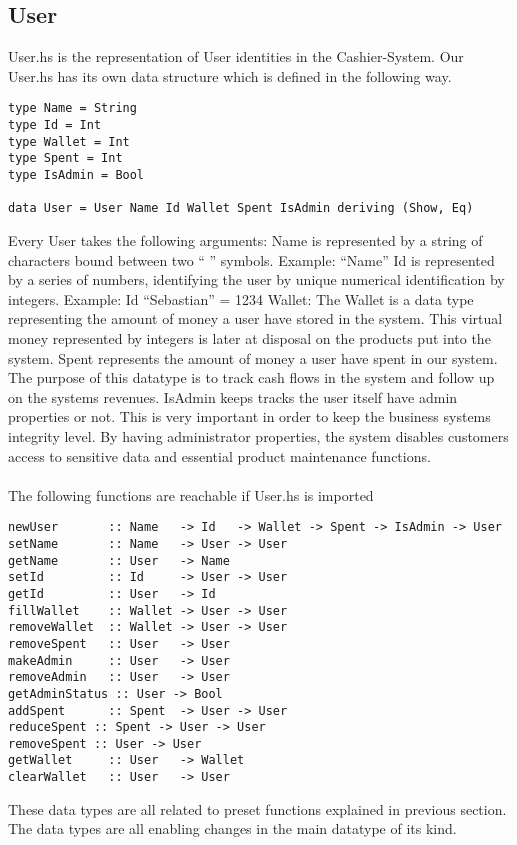 \documentclass[11pt]{article}
\begin{document}
\pagebreak
\subsection{User}
User.hs is the representation of User identities in the Cashier-System. Our User.hs has its own data structure which is defined in the following way.
\begin{lstlisting}
type Name = String
type Id = Int
type Wallet = Int
type Spent = Int
type IsAdmin = Bool

data User = User Name Id Wallet Spent IsAdmin deriving (Show, Eq)
\end{lstlisting}
Every User takes the following arguments:
Name is represented by a string of characters bound between two “ ” symbols.
Example: “Name”
Id is represented by a series of numbers, identifying the user by unique numerical identification by integers.
Example: Id “Sebastian” = 1234
Wallet: The Wallet is a data type representing the amount of money a user have stored in the system. This virtual money represented by integers is later at disposal on the products put into the system.
Spent represents the amount of money a user have spent in our system. The purpose of this datatype is to track cash flows in the system and follow up on the systems revenues.
IsAdmin keeps tracks the user itself have admin properties or not. This is very important in order to keep the business systems integrity level. By having administrator properties, the system disables customers access to sensitive data and essential product maintenance functions.
\\\\
The following functions are reachable if User.hs is imported\\
\begin{lstlisting}
newUser       :: Name   -> Id   -> Wallet -> Spent -> IsAdmin -> User
setName       :: Name   -> User -> User
getName       :: User   -> Name
setId         :: Id     -> User -> User
getId         :: User   -> Id
fillWallet    :: Wallet -> User -> User
removeWallet  :: Wallet -> User -> User
removeSpent   :: User   -> User
makeAdmin     :: User   -> User
removeAdmin   :: User   -> User
getAdminStatus :: User -> Bool
addSpent      :: Spent  -> User -> User
reduceSpent :: Spent -> User -> User
removeSpent :: User -> User
getWallet     :: User   -> Wallet
clearWallet   :: User   -> User
\end{lstlisting}
These data types are all related to preset functions explained in previous section.
The data types are all enabling changes in the main datatype of its kind.
\end{document}
